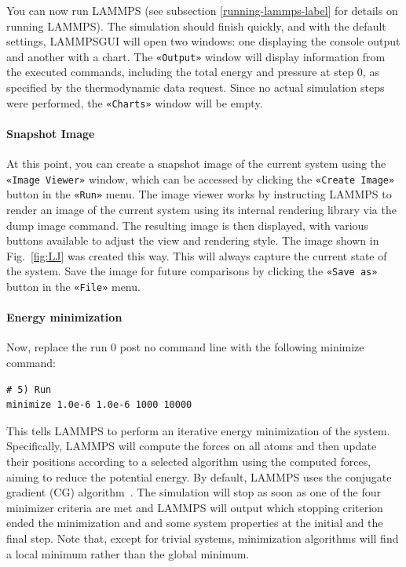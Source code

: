 \documentclass[9pt,tutorial]{livecoms}
\newcommand{\lmpcmd}[1]{\hspace{0pt}\colorbox{listing}{\textcolor{command}{\small{#1}}}\hspace{0pt}} %
\newcommand{\guicmd}[1]{\textcolor{command}{\texttt{«#1»}}} %
\newcommand{\lammpsgui}{\textsf{LAMMPS\textendash GUI}}
\begin{document}
You can now run LAMMPS {\color{blue}(see subsection \ref{running-lammps-label}
for details on running LAMMPS)}.  The simulation should finish quickly, and with the default
settings, \lammpsgui{} will open two windows: one displaying the console
output and another with a chart.  The \guicmd{Output} window will display information from
the executed commands, including the total energy and pressure at step 0,
as specified by the thermodynamic data request.  Since no actual simulation
steps were performed, the \guicmd{Charts} window will be empty.

\paragraph{Snapshot Image}

At this point, you can create a snapshot image of the current system
using the \guicmd{Image Viewer} window, which can be accessed by
clicking the \guicmd{Create Image} button in the \guicmd{Run} menu.  The
image viewer works by instructing LAMMPS to render an image of the
current system using its internal rendering library via the \lmpcmd{dump
  image} command.  The resulting image is then displayed, with various
buttons available to adjust the view and rendering style.  The image
shown in Fig.~\ref{fig:LJ} was created this way.  This will always
capture the current state of the system.  Save the image for future
comparisons {\color{blue}by clicking the \guicmd{Save as} button 
in the \guicmd{File} menu}.

\paragraph{Energy minimization}

Now, replace the \lmpcmd{run 0 post no} command line with the
following \lmpcmd{minimize} command:
\begin{lstlisting}
# 5) Run
minimize 1.0e-6 1.0e-6 1000 10000
\end{lstlisting}
This tells LAMMPS to perform an {\color{blue} iterative} energy
minimization of the system.  Specifically, LAMMPS will compute the
forces on all atoms and then update their positions according to a
selected algorithm using the computed forces, aiming to reduce the
potential energy.  By default, LAMMPS uses the conjugate gradient (CG)
algorithm~\cite{hestenes1952methods}.  The simulation will stop as soon
as {\color{blue}one of the four minimizer criteria are met and LAMMPS
  will output which stopping criterion ended the minimization and
  and some system properties at the initial and the final step.}
Note that, except for trivial systems, minimization algorithms will find a
local minimum rather than the global minimum.
\end{document}
